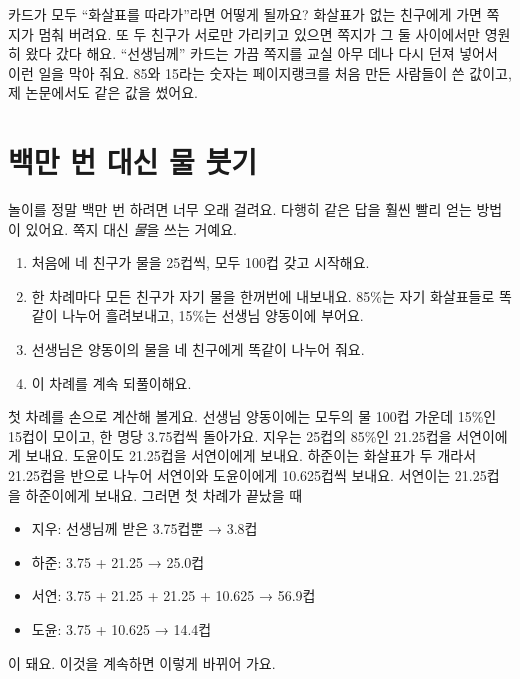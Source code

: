 카드가 모두 “화살표를 따라가”라면 어떻게 될까요?
화살표가 없는 친구에게 가면 쪽지가 멈춰 버려요.
또 두 친구가 서로만 가리키고 있으면 쪽지가 그 둘 사이에서만 영원히 왔다 갔다 해요.
“선생님께” 카드는 가끔 쪽지를 교실 아무 데나 다시 던져 넣어서 이런 일을 막아 줘요.
85와 15라는 숫자는 페이지랭크를 처음 만든 사람들이 쓴 값이고,
제 논문에서도 같은 값을 썼어요.

\section{백만 번 대신 물 붓기}

놀이를 정말 백만 번 하려면 너무 오래 걸려요.
다행히 같은 답을 훨씬 빨리 얻는 방법이 있어요.
쪽지 대신 \emph{물}을 쓰는 거예요.

\begin{enumerate}
\item 처음에 네 친구가 물을 25컵씩, 모두 100컵 갖고 시작해요.
\item 한 차례마다 모든 친구가 자기 물을 한꺼번에 내보내요.
      85\%는 자기 화살표들로 똑같이 나누어 흘려보내고,
      15\%는 선생님 양동이에 부어요.
\item 선생님은 양동이의 물을 네 친구에게 똑같이 나누어 줘요.
\item 이 차례를 계속 되풀이해요.
\end{enumerate}

첫 차례를 손으로 계산해 볼게요.
선생님 양동이에는 모두의 물 100컵 가운데 15\%인 15컵이 모이고, 한 명당 3.75컵씩 돌아가요.
지우는 25컵의 85\%인 21.25컵을 서연이에게 보내요.
도윤이도 21.25컵을 서연이에게 보내요.
하준이는 화살표가 두 개라서 21.25컵을 반으로 나누어 서연이와 도윤이에게 10.625컵씩 보내요.
서연이는 21.25컵을 하준이에게 보내요.
그러면 첫 차례가 끝났을 때

\begin{itemize}
\item 지우: 선생님께 받은 3.75컵뿐 → 3.8컵
\item 하준: 3.75 + 21.25 → 25.0컵
\item 서연: 3.75 + 21.25 + 21.25 + 10.625 → 56.9컵
\item 도윤: 3.75 + 10.625 → 14.4컵
\end{itemize}

이 돼요.
이것을 계속하면 이렇게 바뀌어 가요.

